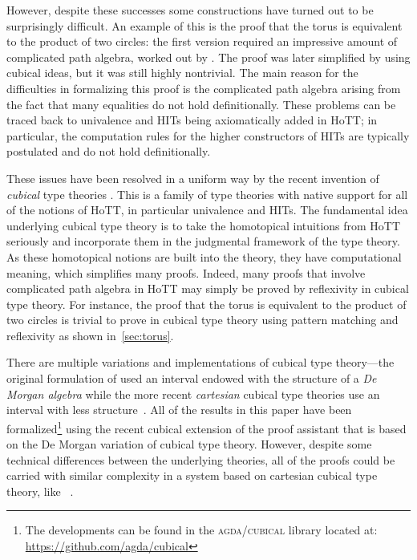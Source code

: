 However, despite these successes some constructions have turned out to be surprisingly
difficult. An example of this is the proof that the torus is
equivalent to the product of two circles: the first version required
an impressive amount of complicated path algebra, worked out by
. The proof was later simplified by
 using cubical ideas, but it was still highly
nontrivial. The main reason for the difficulties in formalizing this
proof is the complicated path algebra arising from the fact that many
equalities do not hold definitionally. These problems can be traced
back to univalence and HITs being axiomatically added in HoTT; in
particular, the computation rules for the higher constructors of HITs
are typically postulated and do not hold definitionally.

These issues have been resolved in a uniform way by the recent
invention of \emph{cubical} type theories
. This is a family of type
theories with native support for all of the notions of HoTT, in
particular univalence and HITs. The fundamental idea underlying
cubical type theory is to take the homotopical intuitions from HoTT
seriously and incorporate them in the judgmental framework of the type
theory. As these homotopical notions are built into the theory, they
have computational meaning, which simplifies many proofs. Indeed, many
proofs that involve complicated path algebra in HoTT may simply be
proved by reflexivity in cubical type theory. For instance, the proof
that the torus is equivalent to the product of two circles is trivial
to prove in cubical type theory using pattern matching and reflexivity
as shown in~\cref{sec:torus}.

There are multiple variations and implementations of cubical type
theory---the original formulation of  used an interval
endowed with the structure of a \emph{De Morgan algebra} while the
more recent \emph{cartesian} cubical type theories use an interval
with less structure~. All of the
results in this paper have been formalized\footnote{The developments
  can be found in the \textsc{agda/cubical} library located
  at:\\ \url{https://github.com/agda/cubical}} using the recent
cubical extension  of the \Agda{} proof assistant
 that is based on the De Morgan variation of cubical type
theory. However, despite some technical differences between the
underlying theories, all of the proofs could be carried with similar
complexity in a system based on cartesian cubical type theory, like
\redtt{}~.

